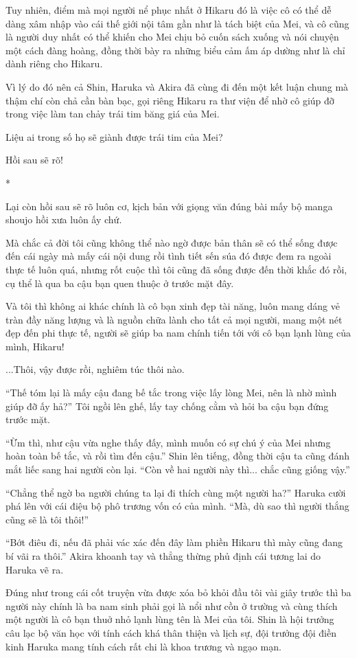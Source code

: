 {Tuy nhiên, điểm mà mọi người nể phục nhất ở Hikaru đó là việc cô có thể
dễ dàng xâm nhập vào cái thế giới nội tâm gần như là tách biệt của Mei,
và cô cũng là người duy nhất có thể khiến cho Mei chịu bỏ cuốn sách
xuống và nói chuyện một cách đàng hoàng, đồng thời bày ra những biểu cảm
ấm áp dường như là chỉ dành riêng cho Hikaru.

Vì lý do đó nên cả Shin, Haruka và Akira đã cùng đi đến một kết luận
chung mà thậm chí còn chả cần bàn bạc, gọi riêng Hikaru ra thư viện để
nhờ cô giúp đỡ trong việc làm tan chảy trái tim băng giá của Mei.

Liệu ai trong số họ sẽ giành được trái tim của Mei?

Hồi sau sẽ rõ!

*

Lại còn hồi sau sẽ rõ luôn cơ, kịch bản với giọng văn đúng bài mấy bộ
manga shoujo hồi xưa luôn ấy chứ.

Mà chắc cả đời tôi cũng không thể nào ngờ được bản thân sẽ có thể sống
được đến cái ngày mà mấy cái nội dung rồi tình tiết sến súa đó được đem
ra ngoài thực tế luôn quá, nhưng rốt cuộc thì tôi cũng đã sống được đến
thời khắc đó rồi, cụ thể là qua ba cậu bạn quen thuộc ở trước mặt đây.

Và tôi thì không ai khác chính là cô bạn xinh đẹp tài năng, luôn mang
dáng vẻ tràn đầy năng lượng và là nguồn chữa lành cho tất cả mọi người,
mang một nét đẹp đến phi thực tế, người sẽ giúp ba nam chính tiến tới
với cô bạn lạnh lùng của mình, Hikaru!

...Thôi, vậy được rồi, nghiêm túc thôi nào.

``Thế tóm lại là mấy cậu đang bế tắc trong việc lấy lòng Mei, nên là nhờ
mình giúp đỡ ấy hả?'' Tôi ngồi lên ghế, lấy tay chống cằm và hỏi ba cậu
bạn đứng trước mặt.

``Ừm thì, như cậu vừa nghe thấy đấy, mình muốn có sự chú ý của Mei nhưng
hoàn toàn bế tắc, và rồi tìm đến cậu.'' Shin lên tiếng, đồng thời cậu ta
cũng đánh mắt liếc sang hai người còn lại. ``Còn về hai người này thì...
chắc cũng giống vậy.''

``Chẳng thể ngờ ba người chúng ta lại đi thích cùng một người ha?''
Haruka cười phá lên với cái điệu bộ phô trương vốn có của mình. ``Mà, dù
sao thì người thắng cũng sẽ là tôi thôi!''

``Bớt điêu đi, nếu đã phải vác xác đến đây làm phiền Hikaru thì mày cũng
đang bí vãi ra thôi.'' Akira khoanh tay và thẳng thừng phủ định cái
tương lai do Haruka vẽ ra.

Đúng như trong cái cốt truyện vừa được xóa bỏ khỏi đầu tôi vài giây
trước thì ba người này chính là ba nam sinh phải gọi là nổi như cồn ở
trường và cùng thích một người là cô bạn thuở nhỏ lạnh lùng tên là Mei
của tôi. Shin là hội trưởng câu lạc bộ văn học với tính cách khá thân
thiện và lịch sự, đội trưởng đội điền kinh Haruka mang tính cách rất chi
là khoa trương và ngạo mạn.

}
